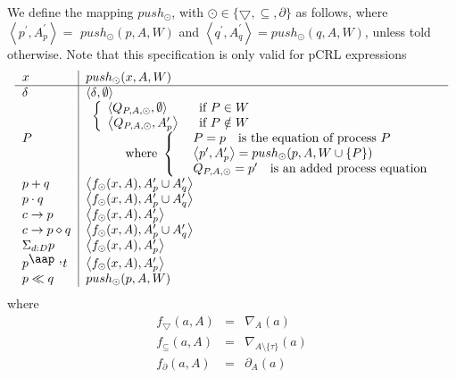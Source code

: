 \documentclass{article}
\begin{document}
We define the mapping $push_{\odot }$, with $\odot \in \{\bigtriangledown
,\subseteq ,\partial \}$ as follows, where $\left\langle p^{\prime
},A_{p}^{\prime }\right\rangle =$ $push_{\odot }(p,A,W)$ and $\left\langle
q^{\prime },A_{q}^{\prime }\right\rangle =push_{\odot }(q,A,W)$, unless told
otherwise. Note that this specification is only valid for pCRL expressions%
\[
\begin{tabular}{l|l}
$x$ & $push_{\odot }(x,A,W)$ \\ \hline
$\delta $ & $\left\langle \delta ,\emptyset \right\rangle $ \\ 
$P$ & $%
\begin{array}{l}
\left\{ 
\begin{array}{ll}
\left\langle Q_{P,A,\odot },\emptyset \right\rangle & \text{if }P\in W \\ 
\left\langle Q_{P,A,\odot },A_{p}^{\prime }\right\rangle & \text{if }P\notin
W%
\end{array}%
\right. \\ 
\qquad \text{where }\left\{ \text{ }%
\begin{array}{l}
P=p\text{ is the equation of process }P \\ 
\left\langle p^{\prime },A_{p}^{\prime }\right\rangle =push_{\odot
}(p,A,W\cup \{P\}) \\ 
Q_{P,A,\odot }=p^{\prime }\text{ is an added process equation}%
\end{array}%
\right.%
\end{array}%
$ \\ 
$p+q$ & $\left\langle f_{\odot }(x,A),A_{p}^{\prime }\cup A_{q}^{\prime
}\right\rangle $ \\ 
$p\cdot q$ & $\left\langle f_{\odot }(x,A),A_{p}^{\prime }\cup A_{q}^{\prime
}\right\rangle $ \\ 
$c\rightarrow p$ & $\left\langle f_{\odot }(x,A),A_{p}^{\prime
}\right\rangle $ \\ 
$c\rightarrow p\diamond q$ & $\left\langle f_{\odot }(x,A),A_{p}^{\prime
}\cup A_{q}^{\prime }\right\rangle $ \\ 
$\Sigma _{d:D}p$ & $\left\langle f_{\odot }(x,A),A_{p}^{\prime
}\right\rangle $ \\ 
$p^{\mathbin{\mbox{\aap ,}}}t$ & $\left\langle f_{\odot }(x,A),A_{p}^{\prime
}\right\rangle $ \\ 
$p\ll q$ & $push_{\odot }(p,A,W)$%
\end{tabular}%
\]%
where%
\begin{eqnarray*}
f_{\bigtriangledown }(a,A) &=&\nabla _{A}(a) \\
f_{\subseteq }(a,A) &=&\nabla _{A\setminus \{\tau \}}(a) \\
f_{\partial }(a,A) &=&\partial _{A}(a)
\end{eqnarray*}%
\end{document}
